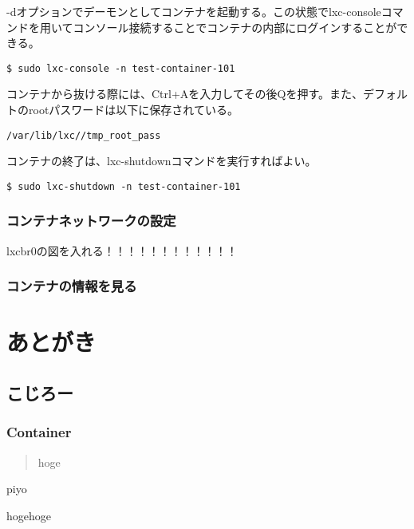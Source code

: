 \documentclass[9pt,b5paper,tombo]{jsbook}
\begin{document}
-dオプションでデーモンとしてコンテナを起動する。この状態でlxc-consoleコマンドを用いてコンソール接続することでコンテナの内部にログインすることができる。

\begin{lstlisting}
$ sudo lxc-console -n test-container-101
\end{lstlisting}

コンテナから抜ける際には、Ctrl+Aを入力してその後Qを押す。また、デフォルトのrootパスワードは以下に保存されている。

\begin{lstlisting}
/var/lib/lxc//tmp_root_pass
\end{lstlisting}

コンテナの終了は、lxc-shutdownコマンドを実行すればよい。

\begin{lstlisting}
$ sudo lxc-shutdown -n test-container-101
\end{lstlisting}


\subsection{コンテナネットワークの設定}
lxcbr0の図を入れる！！！！！！！！！！！！

\subsection{コンテナの情報を見る}




\chapter{あとがき}

\section{こじろー}

\subsection{Container}

\begin{quote}
hoge
\end{quote}

\begin{flushright}
piyo
\end{flushright}

hogehoge
\end{document}

